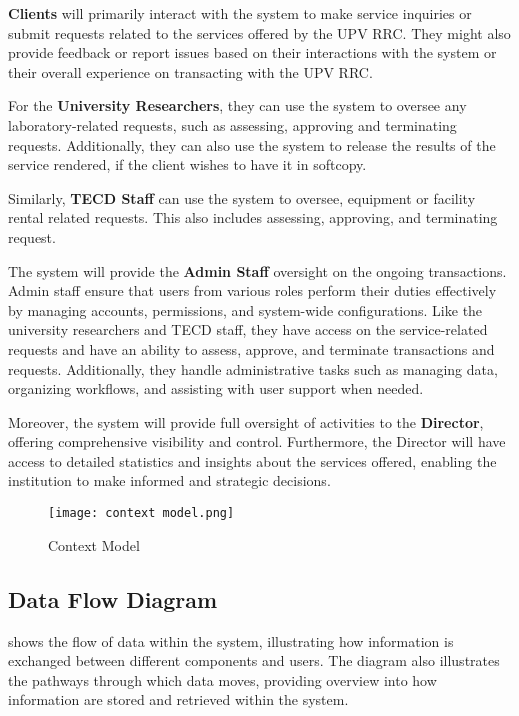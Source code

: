 \textbf{Clients} will primarily interact with the system to make service inquiries or submit requests related to the services offered by the UPV RRC. They might also provide feedback or report issues based on their interactions with the system or their overall experience on transacting with the UPV RRC.

For the \textbf{University Researchers}, they can use the system to oversee any laboratory-related requests, such as assessing, approving and terminating requests. Additionally, they can also use the system to release the results of the service rendered, if the client wishes to have it in softcopy. 

Similarly, \textbf{TECD Staff} can use the system to oversee, equipment or facility rental related requests. This also includes assessing, approving, and terminating request. 

The system will provide the \textbf{Admin Staff} oversight on the ongoing transactions. Admin staff ensure that users from various roles perform their duties effectively by managing accounts, permissions, and system-wide configurations. Like the university researchers and TECD staff, they have access on the service-related requests and have an ability to assess, approve, and terminate transactions and requests. Additionally, they handle administrative tasks such as managing data, organizing workflows, and assisting with user support when needed.

Moreover, the system will provide full oversight of activities to the \textbf{Director}, offering comprehensive visibility and control. Furthermore, the Director will have access to detailed statistics and insights about the services offered, enabling the institution to make informed and strategic decisions.

\begin{figure}[h]
	\centering 
	\texttt{[image: context model.png]}
	\caption{Context Model}
	\label{fig:context_model}
\end{figure}

\newpage

\subsection{Data Flow Diagram}

 shows the flow of data within the system, illustrating how information is exchanged between different components and users. The diagram also illustrates the pathways through which data moves, providing overview into how information are stored and retrieved within the system.


